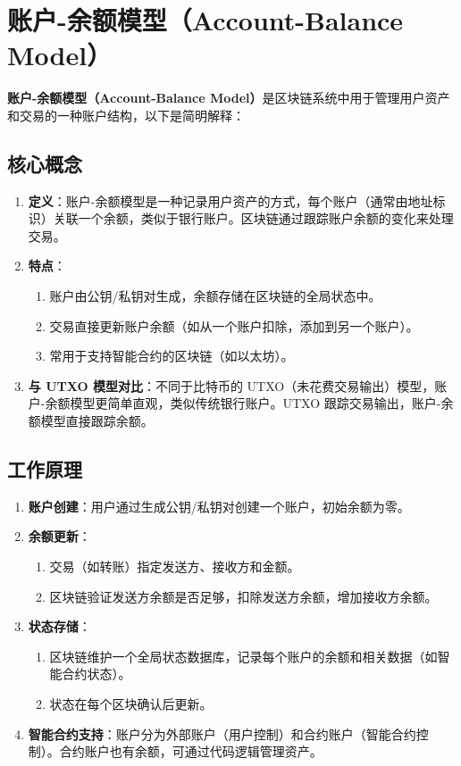 \documentclass[12pt]{ctexart}
\begin{document}
\newpage

\section{账户-余额模型（Account-Balance Model）}
\textbf{账户-余额模型（Account-Balance Model）}是区块链系统中用于管理用户资产和交易的一种账户结构，以下是简明解释：

\subsection{核心概念}
\begin{enumerate}
    \item \textbf{定义}：账户-余额模型是一种记录用户资产的方式，每个账户（通常由地址标识）关联一个余额，类似于银行账户。区块链通过跟踪账户余额的变化来处理交易。
    \item \textbf{特点}：
        \begin{enumerate}
            \item 账户由公钥/私钥对生成，余额存储在区块链的全局状态中。
            \item 交易直接更新账户余额（如从一个账户扣除，添加到另一个账户）。
            \item 常用于支持智能合约的区块链（如以太坊）。
        \end{enumerate}
    \item \textbf{与 UTXO 模型对比}：不同于比特币的 UTXO（未花费交易输出）模型，账户-余额模型更简单直观，类似传统银行账户。UTXO 跟踪交易输出，账户-余额模型直接跟踪余额。
\end{enumerate}

\subsection{工作原理}
\begin{enumerate}
    \item \textbf{账户创建}：用户通过生成公钥/私钥对创建一个账户，初始余额为零。
    \item \textbf{余额更新}：
        \begin{enumerate}
            \item 交易（如转账）指定发送方、接收方和金额。
            \item 区块链验证发送方余额是否足够，扣除发送方余额，增加接收方余额。
        \end{enumerate}
    \item \textbf{状态存储}：
        \begin{enumerate}
            \item 区块链维护一个全局状态数据库，记录每个账户的余额和相关数据（如智能合约状态）。
            \item 状态在每个区块确认后更新。
        \end{enumerate}
    \item \textbf{智能合约支持}：账户分为外部账户（用户控制）和合约账户（智能合约控制）。合约账户也有余额，可通过代码逻辑管理资产。
\end{enumerate}
\end{document}
